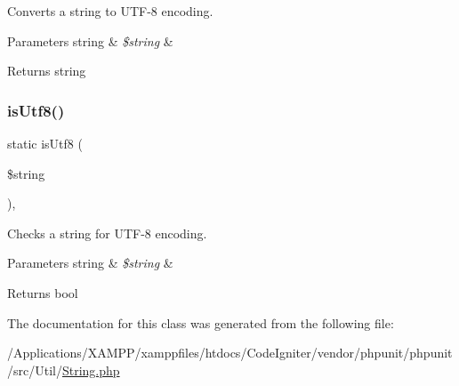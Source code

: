 Converts a string to U\+T\+F-\/8 encoding.


\begin{DoxyParams}[1]{Parameters}
string & {\em \$string} & \\
\hline
\end{DoxyParams}
\begin{DoxyReturn}{Returns}
string 
\end{DoxyReturn}
\mbox{\label{class_p_h_p_unit___util___string_a179507b167903e4bbdf95572e24bbe61}} 
\subsubsection{\texorpdfstring{is\+Utf8()}{isUtf8()}}
{\footnotesize\ttfamily static is\+Utf8 (\begin{DoxyParamCaption}\item[{}]{\$string }\end{DoxyParamCaption})\hspace{0.3cm}{\ttfamily [static]}, {\ttfamily [protected]}}

Checks a string for U\+T\+F-\/8 encoding.


\begin{DoxyParams}[1]{Parameters}
string & {\em \$string} & \\
\hline
\end{DoxyParams}
\begin{DoxyReturn}{Returns}
bool 
\end{DoxyReturn}


The documentation for this class was generated from the following file\+:\begin{DoxyCompactItemize}
\item 
/\+Applications/\+X\+A\+M\+P\+P/xamppfiles/htdocs/\+Code\+Igniter/vendor/phpunit/phpunit/src/\+Util/\mbox{\hyperlink{_string_8php}{String.\+php}}\end{DoxyCompactItemize}

